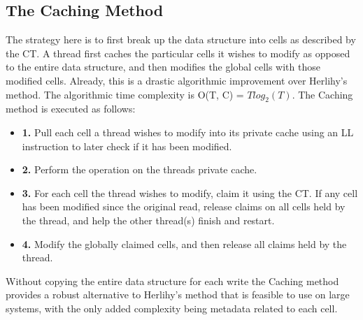 \documentclass{article}
\begin{document}
\subsection*{The Caching Method}
The strategy here is to first break up the data structure into cells as described by the CT. A thread first caches the particular cells it wishes to modify as opposed to the entire data structure, and then modifies the global cells with those modified cells. Already, this is a drastic algorithmic improvement over Herlihy's method. The algorithmic time complexity is O(T, C) = \(Tlog_{2}(T)\). The Caching method is executed as follows:
\begin{itemize}
    \item \textbf{1.} Pull each cell a thread wishes to modify into its private cache using an LL instruction to later check if it has been modified.
    \item \textbf{2.} Perform the operation on the threads private cache.
    \item \textbf{3.} For each cell the thread wishes to modify, claim it using the CT. If any cell has been modified since the original read, release claims on all cells held by the thread, and help the other thread(s) finish and restart.
    \item \textbf{4.} Modify the globally claimed cells, and then release all claims held by the thread.
\end{itemize}
Without copying the entire data structure for each write the Caching method provides a robust alternative to Herlihy's method that is feasible to use on large systems, with the only added complexity being metadata related to each cell.
\end{document}
